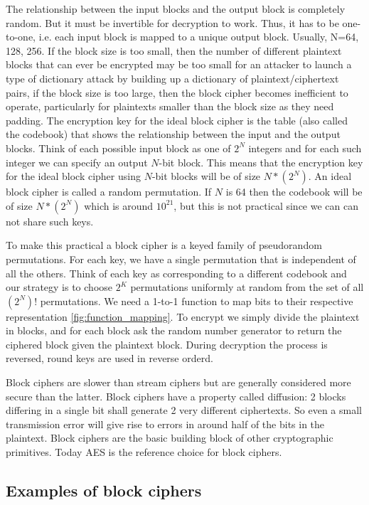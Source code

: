 The relationship between the input blocks and the output block is completely random. But it must be invertible for decryption to work. Thus, it has to be one-to-one, i.e. each input block is mapped to a unique output block. Usually, N=64, 128, 256. If the block size is too small, then the number of different plaintext blocks that can ever be encrypted may be too small for an attacker to launch a type of dictionary attack by building up a dictionary of plaintext/ciphertext pairs, if the block size is too large, then the block cipher becomes inefficient to operate, particularly for plaintexts smaller than the block size as they need padding. The encryption key for the ideal block cipher is the table (also called the codebook) that shows the relationship between the input and the output blocks. Think of each possible input block as one of $2^N$ integers and for each such integer we can specify an output $N$-bit block. This means that the encryption key for the ideal block cipher using $N$-bit blocks will be of size $N*(2^N)$. An ideal block cipher is called a random permutation. If $N$ is 64 then the codebook will be of size $N*(2^N)$ which is around $10^{21}$, but this is not practical since we can can not share such keys.

To make this practical a block cipher is a keyed family of pseudorandom permutations. For each key, we have a single permutation that is independent of all the others. Think of each key as corresponding to a different codebook and our strategy is to choose $2^K$ permutations uniformly at random from the set of all $(2^N)!$ permutations. 
We need a 1-to-1 function to map bits to their respective representation \ref{fig:function_mapping}. 
To encrypt we simply divide the plaintext in blocks, and for each block ask the random number generator to return the ciphered block given the plaintext block. During decryption the process is reversed, round keys are used in reverse orderd. 

Block ciphers are slower than stream ciphers but are generally considered more secure than the latter.
Block ciphers have a property called diffusion: 2 blocks differing in a single bit shall generate 2 very different ciphertexts. So even a small transmission error will give rise to errors in around half of the bits in the plaintext. Block ciphers are the basic building block of other cryptographic primitives. Today AES is the reference choice for block ciphers.

\subsection{Examples of block ciphers}

